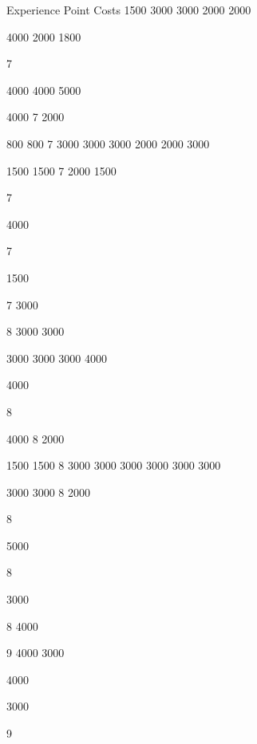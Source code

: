 \begin{Chapter}{Experience Point Costs}
1500 
3000 
3000 
2000 
2000 
  
4000 
2000 
1800 
  
7 
  
4000 
4000 
5000 
  
  
  
  
  
  
  
  
  
  
4000 
7 
2000 
  
  
  
  
  
  
  
800 
800 
7 
3000 
3000 
3000 
2000 
2000 
3000 
  
  
1500 
1500 
7 
2000 
1500 
  
7 
 
 
4000 
 
7 
 
1500 
 
  
 
7 
3000 

8 
3000 
3000 
  
3000 
3000 
3000 
4000 
  
  
4000 
  
  
  
8 
  
  
  
  
  
  
  
  
  
  
  
  
  
  
4000 
8 
2000 
  
  
  
  
  
  
  
1500 
1500 
8 
3000 
3000 
3000 
3000 
3000 
3000 
  
  
3000 
3000 
8 
2000 
  
  
8 
 
 
5000 
 
8 
 
3000 
 
  
 
8 
4000 

9 
4000 
3000 
  
  
  
  
4000 
  
  
3000 
  
  
  
9 
  
  
  

\end{Chapter}
